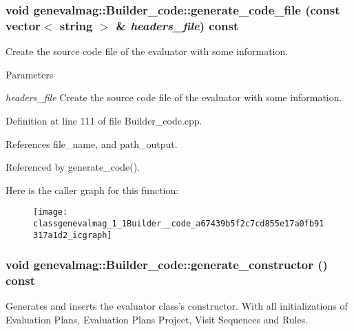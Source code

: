 \hypertarget{classgenevalmag_1_1Builder__code_a67439b5f2c7cd855e17a0fb91317a1d2}{
\subsubsection[{generate\_\-code\_\-file}]{\setlength{\rightskip}{0pt plus 5cm}void genevalmag::Builder\_\-code::generate\_\-code\_\-file (const vector$<$ string $>$ \& {\em headers\_\-file}) const}}
\label{classgenevalmag_1_1Builder__code_a67439b5f2c7cd855e17a0fb91317a1d2}
Create the source code file of the evaluator with some information. 
\begin{DoxyParams}{Parameters}
\item[{\em headers\_\-file}]Create the source code file of the evaluator with some information. \end{DoxyParams}


Definition at line 111 of file Builder\_\-code.cpp.



References file\_\-name, and path\_\-output.



Referenced by generate\_\-code().



Here is the caller graph for this function:\nopagebreak
\begin{figure}[H]
\begin{center}
\leavevmode
\texttt{[image: classgenevalmag\_1\_1Builder\_\_code\_a67439b5f2c7cd855e17a0fb91317a1d2\_icgraph]}
\end{center}
\end{figure}


\hypertarget{classgenevalmag_1_1Builder__code_ac390149dae2358dda72ff8360f30c693}{
\subsubsection[{generate\_\-constructor}]{\setlength{\rightskip}{0pt plus 5cm}void genevalmag::Builder\_\-code::generate\_\-constructor () const}}
\label{classgenevalmag_1_1Builder__code_ac390149dae2358dda72ff8360f30c693}
Generates and inserts the evaluator class's constructor. With all initializations of Evaluation Plans, Evaluation Plans Project, Visit Sequences and Rules. 

